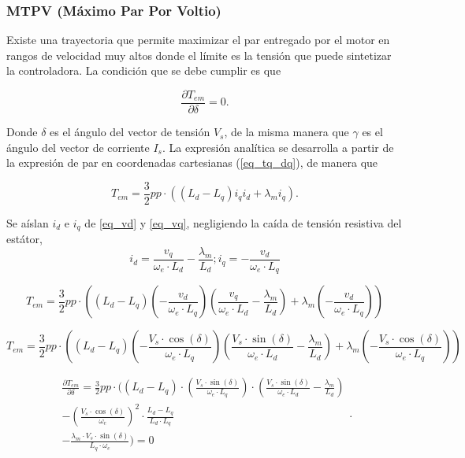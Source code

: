 \subsubsection{MTPV (Máximo Par Por Voltio)}

Existe una trayectoria que permite maximizar el par entregado por el motor en rangos de velocidad muy altos donde el límite es la tensión que puede sintetizar la controladora. La condición que se debe cumplir es que

\begin{equation}
\frac{\partial T_{em}}{\partial \delta} = 0 \text{.}
\end{equation}

Donde $\delta$ es el ángulo del vector de tensión $V_s$, de la misma manera que $\gamma$ es el ángulo del vector de corriente $I_s$. La expresión analítica se desarrolla a partir de la expresión de par en coordenadas cartesianas (\ref{eq_tq_dq}), de manera que

\begin{equation*}
T_{em} = \frac{3}{2}pp\cdot((L_d - L_q) i_q i_d + \lambda_m i_q) \text{.}
\end{equation*}

Se aíslan $i_d$ e $i_q$ de \ref{eq_vd} y \ref{eq_vq}, negligiendo la caída de tensión resistiva del estátor, 
\begin{equation}
i_d = \frac{v_q}{\omega_e \cdot L_d} - \frac{\lambda_m}{L_d}; i_q = -\frac{v_d}{\omega_e \cdot L_q}
\end{equation}

\begin{equation}
T_{em} = \frac{3}{2}pp\cdot\left((L_d - L_q) (-\frac{v_d}{\omega_e \cdot L_q}) (\frac{v_q}{\omega_e \cdot L_d} - \frac{\lambda_m}{L_d}) + \lambda_m (-\frac{v_d}{\omega_e \cdot L_q})\right)
\end{equation}

\begin{equation}
T_{em} = \frac{3}{2}pp\cdot\left((L_d - L_q) (-\frac{V_s \cdot \cos(\delta)}{\omega_e \cdot L_q}) (\frac{V_s \cdot \sin(\delta)}{\omega_e \cdot L_d} - \frac{\lambda_m}{L_d}) + \lambda_m (-\frac{V_s \cdot \cos(\delta)}{\omega_e \cdot L_q})\right)
\end{equation}

\begin{equation}
\begin{split}
\frac{\partial T_{em}}{\partial \delta} = \frac{3}{2}pp\cdot (
(L_d - L_q) \cdot (\frac{V_s \cdot \sin(\delta)}{\omega_e \cdot L_q}) \cdot (\frac{V_s \cdot \sin(\delta)}{\omega_e \cdot L_d} - \frac{\lambda_m}{L_d})\\
-\left(\frac{V_s \cdot \cos(\delta)}{\omega_e}\right)^2 \cdot \frac{L_d - L_q}{L_d\cdot L_q}\\ 
-\frac{\lambda_m \cdot V_s \cdot \sin(\delta)}{L_q \cdot \omega_e} ) = 0
\end{split} \text{.}
\end{equation}

